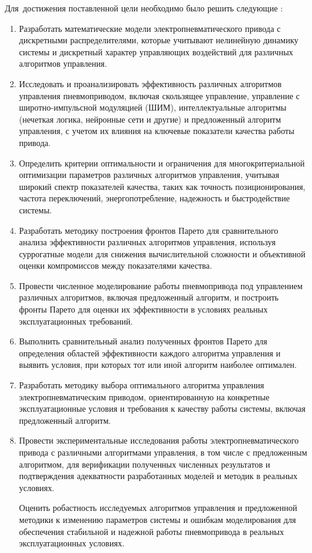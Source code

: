 Для~достижения поставленной цели необходимо было решить следующие {\tasks}:
\begin{enumerate}[beginpenalty=10000] %
\item Разработать математические модели электропневматического привода с дискретными распределителями,
которые учитывают нелинейную динамику системы и дискретный характер управляющих воздействий для различных алгоритмов управления.

\item Исследовать и проанализировать эффективность различных алгоритмов управления пневмоприводом,
включая скользящее управление, управление с широтно-импульсной модуляцией (ШИМ),
интеллектуальные алгоритмы (нечеткая логика, нейронные сети и другие) и предложенный
алгоритм управления, с учетом их влияния на ключевые показатели качества работы привода.

\item Определить критерии оптимальности и ограничения для многокритериальной оптимизации
параметров различных алгоритмов управления, учитывая широкий спектр показателей качества,
таких как точность позиционирования, частота переключений, энергопотребление, надежность и быстродействие системы.

\item Разработать методику построения фронтов Парето для сравнительного анализа
эффективности различных алгоритмов управления, используя суррогатные модели для
снижения вычислительной сложности и объективной оценки компромиссов между показателями качества.

\item Провести численное моделирование работы пневмопривода под управлением различных алгоритмов,
включая предложенный алгоритм, и построить фронты Парето для оценки их эффективности в условиях реальных эксплуатационных требований.

\item Выполнить сравнительный анализ полученных фронтов Парето для определения областей эффективности каждого
алгоритма управления и выявить условия, при которых тот или иной алгоритм наиболее оптимален.

\item Разработать методику выбора оптимального алгоритма управления электропневматическим приводом,
ориентированную на конкретные эксплуатационные условия и требования к качеству работы системы, включая предложенный алгоритм.

\item Провести экспериментальные исследования работы электропневматического привода с различными
алгоритмами управления, в том числе с предложенным алгоритмом, для верификации полученных
численных результатов и подтверждения адекватности разработанных моделей и методик в реальных условиях.

Оценить робастность исследуемых алгоритмов управления и предложенной методики к изменению
параметров системы и ошибкам моделирования для обеспечения стабильной и
надежной работы пневмопривода в реальных эксплуатационных условиях.
\end{enumerate}



